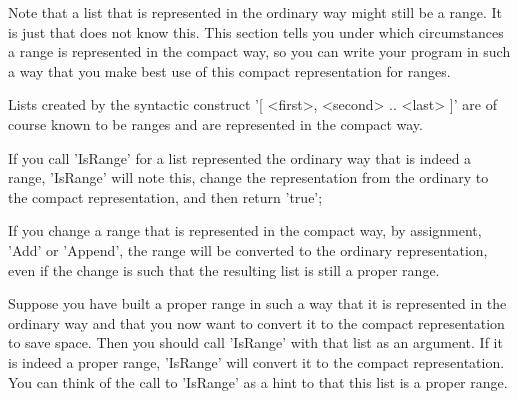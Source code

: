 Note that a list that is represented in the ordinary way might still be a
range.  It is just that {\GAP} does not  know this.   This  section tells
you under which circumstances a range is represented  in the compact way,
so you can write your  program in such  a  way that you make best  use of
this compact representation for ranges.

Lists  created by the syntactic construct '[ <first>, <second>  .. <last>
]' are  of  course known to be ranges and  are represented in the compact
way.

If  you call  'IsRange' for a  list represented the ordinary  way that is
indeed a range, 'IsRange' will note this,  change the representation from
the ordinary to the compact representation, and then return 'true';


If   you change a   range  that is  represented   in the compact  way, by
assignment, 'Add'   or 'Append', the   range will  be   converted to  the
ordinary representation, even  if the change is  such that the  resulting
list is still a proper range.

Suppose  you have   built a proper   range  in  such  a way   that  it is
represented in the  ordinary way and that you  now want to convert  it to
the compact representation to save space.  Then you should call 'IsRange'
with that list as an argument.  If it is indeed a proper range, 'IsRange'
will convert it to the compact representation.  You can think of the call
to 'IsRange' as a hint to {\GAP} that this list is a proper range.




